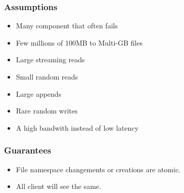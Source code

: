 \documentclass{beamer}
\begin{document}
%
\begin{frame} %
 \frametitle{Assumptions}
 \begin{itemize}
  \item Many component that often fails
  \item Few millions of 100MB to Multi-GB files
  \item Large streaming reads
  \item Small random reads
  \item Large appends
  \item Rare random writes
  \item A high bandwith instead of low latency
 \end{itemize}
\end{frame}

{
\begin{frame}
 \frametitle{Guarantees}
 \begin{center}
 \begin{itemize}
  \item File namespace changements or creations are atomic. %
  \item All client will see the same. %
 \end{itemize}
 \end{center}
\end{frame}
}
\end{document}
